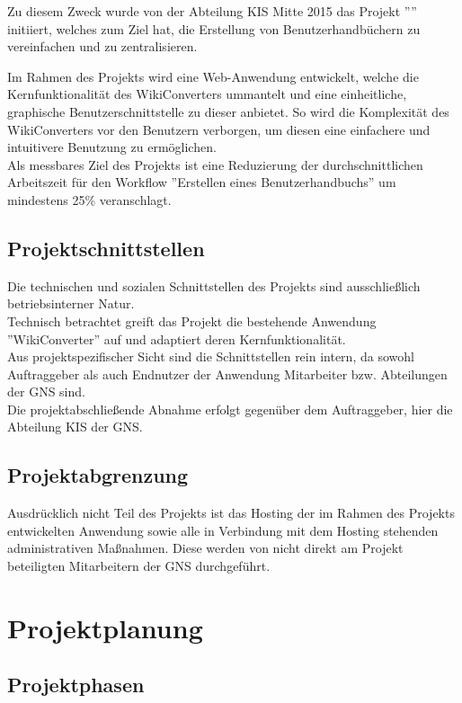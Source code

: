 \documentclass[12pt, xcolor=dvipsnames]{scrartcl}
\begin{document}
Zu diesem Zweck wurde von der Abteilung KIS Mitte 2015 das Projekt ''\Projekt'' initiiert, welches zum Ziel hat, die Erstellung von Benutzerhandbüchern zu vereinfachen und zu zentralisieren.

Im Rahmen des Projekts wird eine Web-Anwendung entwickelt, welche die Kernfunktionalität des WikiConverters ummantelt und eine einheitliche, graphische Benutzerschnittstelle zu dieser anbietet. So wird die Komplexität des WikiConverters vor den Benutzern verborgen, um diesen eine einfachere und intuitivere Benutzung zu ermöglichen. \\

Als messbares Ziel des Projekts ist eine Reduzierung der durchschnittlichen Arbeitszeit für den Workflow ''Erstellen eines Benutzerhandbuchs'' um mindestens 25\% veranschlagt.


\subsection{Projektschnittstellen}

Die technischen und sozialen Schnittstellen des Projekts sind ausschließlich betriebsinterner Natur. \\
Technisch betrachtet greift das Projekt die bestehende Anwendung ''WikiConverter'' auf und adaptiert deren Kernfunktionalität. \\
Aus projektspezifischer Sicht sind die Schnittstellen rein intern, da sowohl Auftraggeber als auch Endnutzer der Anwendung Mitarbeiter bzw. Abteilungen der GNS sind. \\
Die projektabschließende Abnahme erfolgt gegenüber dem Auftraggeber, hier die Abteilung KIS der GNS.


\subsection{Projektabgrenzung}
\label{sec:projektabgrenzung}

Ausdrücklich nicht Teil des Projekts ist das Hosting der im Rahmen des Projekts entwickelten Anwendung sowie alle in Verbindung mit dem Hosting stehenden administrativen Maßnahmen. Diese werden von nicht direkt am Projekt beteiligten Mitarbeitern der GNS durchgeführt.


\section{Projektplanung}

\subsection{Projektphasen} \label{sec:projektphasen}
\end{document}
